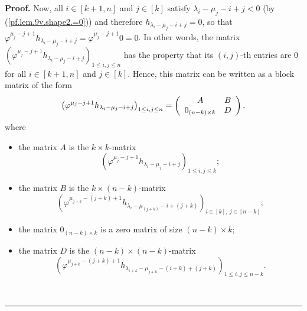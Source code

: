 \documentclass[numbers=enddot,12pt,final,onecolumn,notitlepage]{scrartcl}%
\theoremstyle{definition}
\newenvironment{proof}[1][Proof]{\noindent\textbf{#1.} }{\ \rule{0.5em}{0.5em}}
\begin{document}
\begin{enumerate}
\begin{proof}
Now, all $i\in\left[  k+1,n\right]  $ and $j\in\left[  k\right]  $ satisfy
$\lambda_{i}-\mu_{j}-i+j<0$ (by (\ref{pf.lem.9v.shape2.=0})) and therefore
$h_{\lambda_{i}-\mu_{j}-i+j}=0$, so that $\varphi^{\mu_{j}-j+1}h_{\lambda
_{i}-\mu_{j}-i+j}=\varphi^{\mu_{j}-j+1}0=0$. In other words, the matrix
$\left(  \varphi^{\mu_{j}-j+1}h_{\lambda_{i}-\mu_{j}-i+j}\right)  _{1\leq
i,j\leq n}$ has the property that its $\left(  i,j\right)  $-th entries are
$0$ for all $i\in\left[  k+1,n\right]  $ and $j\in\left[  k\right]  $. Hence,
this matrix can be written as a block matrix of the form%
\[
\left(  \varphi^{\mu_{j}-j+1}h_{\lambda_{i}-\mu_{j}-i+j}\right)  _{1\leq
i,j\leq n}=\left(
\begin{array}
[c]{cc}%
A & B\\
0_{\left(  n-k\right)  \times k} & D
\end{array}
\right)  ,
\]
where

\begin{itemize}
\item the matrix $A$ is the $k\times k$-matrix
\[
\left(  \varphi^{\mu_{j}-j+1}h_{\lambda_{i}-\mu_{j}-i+j}\right)  _{1\leq
i,j\leq k};
\]


\item the matrix $B$ is the $k\times\left(  n-k\right)  $-matrix
\[
\left(  \varphi^{\mu_{j+k}-\left(  j+k\right)  +1}h_{\lambda_{i}-\mu_{\left(
j+k\right)  }-i+\left(  j+k\right)  }\right)  _{i\in\left[  k\right]
,\ j\in\left[  n-k\right]  };
\]


\item the matrix $0_{\left(  n-k\right)  \times k}$ is a zero matrix of size
$\left(  n-k\right)  \times k$;

\item the matrix $D$ is the $\left(  n-k\right)  \times\left(  n-k\right)
$-matrix
\[
\left(  \varphi^{\mu_{j+k}-\left(  j+k\right)  +1}h_{\lambda_{i+k}-\mu
_{j+k}-\left(  i+k\right)  +\left(  j+k\right)  }\right)  _{1\leq i,j\leq
n-k}.
\]

\end{itemize}


\end{proof}
\end{enumerate}
\end{document}
